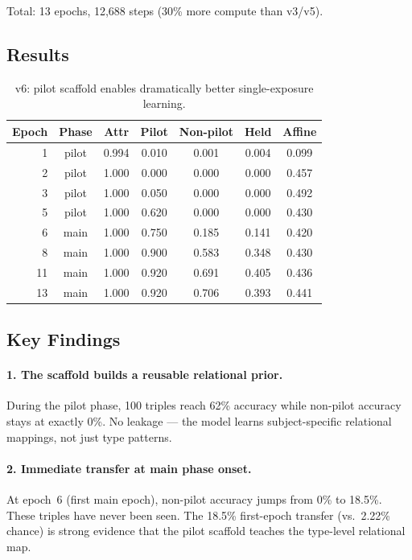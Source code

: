 \documentclass[11pt]{article}
\begin{document}
Total: 13 epochs, 12,688 steps (30\% more compute than v3/v5).

\subsection{Results}

\begin{table}[h]
\centering
\caption{v6: pilot scaffold enables dramatically better single-exposure learning.}
\label{tab:v6}
\begin{tabular}{rcccccc}
\toprule
Epoch & Phase & Attr & Pilot & Non-pilot & Held & Affine \\
\midrule
1 & pilot & 0.994 & 0.010 & 0.001 & 0.004 & 0.099 \\
2 & pilot & 1.000 & 0.000 & 0.000 & 0.000 & 0.457 \\
3 & pilot & 1.000 & 0.050 & 0.000 & 0.000 & 0.492 \\
5 & pilot & 1.000 & 0.620 & 0.000 & 0.000 & 0.430 \\
\midrule
6 & main & 1.000 & 0.750 & 0.185 & 0.141 & 0.420 \\
8 & main & 1.000 & 0.900 & 0.583 & 0.348 & 0.430 \\
11 & main & 1.000 & 0.920 & 0.691 & 0.405 & 0.436 \\
13 & main & 1.000 & 0.920 & 0.706 & 0.393 & 0.441 \\
\bottomrule
\end{tabular}
\end{table}

\subsection{Key Findings}

\paragraph{1. The scaffold builds a reusable relational prior.}
During the pilot phase, 100 triples reach 62\% accuracy while non-pilot accuracy
stays at exactly 0\%.  No leakage --- the model learns subject-specific relational
mappings, not just type patterns.

\paragraph{2. Immediate transfer at main phase onset.}
At epoch~6 (first main epoch), non-pilot accuracy jumps from 0\% to 18.5\%.  These
triples have never been seen.  The 18.5\% first-epoch transfer (vs.\ 2.22\% chance)
is strong evidence that the pilot scaffold teaches the type-level relational map.
\end{document}
